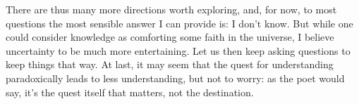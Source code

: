 \documentclass[../thesis.tex]{subfiles}
\begin{document}
There are thus many more directions worth exploring, and, for now, to most questions the
most sensible answer I can provide is: I don't know. But while one could consider
knowledge as comforting some faith in the universe, I believe uncertainty to be much
more entertaining. Let us then keep asking questions to keep things that way.
At last, it may seem that the quest for understanding paradoxically leads to less
understanding, but not to worry:
as the poet would say,
it's the quest itself that matters, not the destination.
\end{document}
